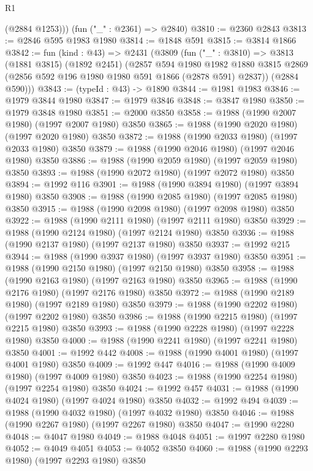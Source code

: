 \begin{lexlean}{R1}
\begin{coremodule}
        (@2884 @1253)))
    (fun ("_" : @2361) => @2840)
@3810 := @2360 @2843
@3813 := @2846 @595 @1983 @1980
@3814 := @1848 @591
@3815 := @3814 @1866
@3842 := fun (kind : @43) =>
  @2431
    (@3809
      (fun ("_" : @3810) =>
      @3813
        (@1881 @3815)
        (@1892 @2451)
        (@2857
          @594
          @1980
          @1982
          @1880
          @3815
          @2869
          (@2856 @592 @196 @1980 @1980 @591 @1866 (@2878 @591) @2837))
        (@2884 @590)))
@3843 := (typeId : @43) -> @1890
@3844 := @1981 @1983
@3846 := @1979 @3844 @1980
@3847 := @1979 @3846
@3848 := @3847 @1980
@3850 := @1979 @3848 @1980
@3851 := @2000 @3850
@3858 := @1988 (@1990 @2007 @1980) (@1997 @2007 @1980) @3850
@3865 := @1988 (@1990 @2020 @1980) (@1997 @2020 @1980) @3850
@3872 := @1988 (@1990 @2033 @1980) (@1997 @2033 @1980) @3850
@3879 := @1988 (@1990 @2046 @1980) (@1997 @2046 @1980) @3850
@3886 := @1988 (@1990 @2059 @1980) (@1997 @2059 @1980) @3850
@3893 := @1988 (@1990 @2072 @1980) (@1997 @2072 @1980) @3850
@3894 := @1992 @116
@3901 := @1988 (@1990 @3894 @1980) (@1997 @3894 @1980) @3850
@3908 := @1988 (@1990 @2085 @1980) (@1997 @2085 @1980) @3850
@3915 := @1988 (@1990 @2098 @1980) (@1997 @2098 @1980) @3850
@3922 := @1988 (@1990 @2111 @1980) (@1997 @2111 @1980) @3850
@3929 := @1988 (@1990 @2124 @1980) (@1997 @2124 @1980) @3850
@3936 := @1988 (@1990 @2137 @1980) (@1997 @2137 @1980) @3850
@3937 := @1992 @215
@3944 := @1988 (@1990 @3937 @1980) (@1997 @3937 @1980) @3850
@3951 := @1988 (@1990 @2150 @1980) (@1997 @2150 @1980) @3850
@3958 := @1988 (@1990 @2163 @1980) (@1997 @2163 @1980) @3850
@3965 := @1988 (@1990 @2176 @1980) (@1997 @2176 @1980) @3850
@3972 := @1988 (@1990 @2189 @1980) (@1997 @2189 @1980) @3850
@3979 := @1988 (@1990 @2202 @1980) (@1997 @2202 @1980) @3850
@3986 := @1988 (@1990 @2215 @1980) (@1997 @2215 @1980) @3850
@3993 := @1988 (@1990 @2228 @1980) (@1997 @2228 @1980) @3850
@4000 := @1988 (@1990 @2241 @1980) (@1997 @2241 @1980) @3850
@4001 := @1992 @442
@4008 := @1988 (@1990 @4001 @1980) (@1997 @4001 @1980) @3850
@4009 := @1992 @447
@4016 := @1988 (@1990 @4009 @1980) (@1997 @4009 @1980) @3850
@4023 := @1988 (@1990 @2254 @1980) (@1997 @2254 @1980) @3850
@4024 := @1992 @457
@4031 := @1988 (@1990 @4024 @1980) (@1997 @4024 @1980) @3850
@4032 := @1992 @494
@4039 := @1988 (@1990 @4032 @1980) (@1997 @4032 @1980) @3850
@4046 := @1988 (@1990 @2267 @1980) (@1997 @2267 @1980) @3850
@4047 := @1990 @2280
@4048 := @4047 @1980
@4049 := @1988 @4048
@4051 := @1997 @2280 @1980
@4052 := @4049 @4051
@4053 := @4052 @3850
@4060 := @1988 (@1990 @2293 @1980) (@1997 @2293 @1980) @3850

\end{coremodule}
\end{lexlean}
